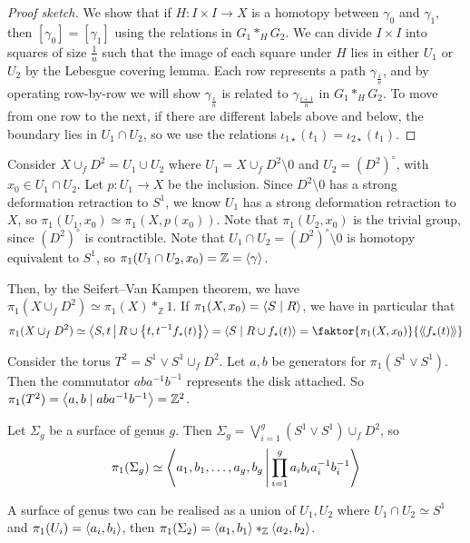\begin{proof}[Proof sketch]
	We show that if \( H \colon I \times I \to X \) is a homotopy between \( \gamma_0 \) and \( \gamma_1 \), then \( [\gamma_0] = [\gamma_1] \) using the relations in \( G_1 \ast_H G_2 \).
	We can divide \( I \times I \) into squares of size \( \frac{1}{n} \) such that the image of each square under \( H \) lies in either \( U_1 \) or \( U_2 \) by the Lebesgue covering lemma.
	Each row represents a path \( \gamma_{\frac{i}{n}} \), and by operating row-by-row we will show \( \gamma_{\frac{i}{n}} \) is related to \( \gamma_{\frac{i+1}{n}} \) in \( G_1 \ast_H G_2 \).
	To move from one row to the next, if there are different labels above and below, the boundary lies in \( U_1 \cap U_2 \), so we use the relations \( \iota_{1\star}(t_1) = \iota_{2\star}(t_1) \).
\end{proof}
\begin{example}
	Consider \( X \cup_f D^2 = U_1 \cup U_2 \) where \( U_1 = X \cup_f D^2 \setminus \qty{0} \) and \( U_2 = (D^2)^\circ \), with \( x_0 \in U_1 \cap U_2 \).
	Let \( p \colon U_1 \to X \) be the inclusion.
	Since \( D^2 \setminus \qty{0} \) has a strong deformation retraction to \( S^1 \), we know \( U_1 \) has a strong deformation retraction to \( X \), so \( \pi_1(U_1,x_0) \simeq \pi_1(X,p(x_0)) \).
	Note that \( \pi_1(U_2,x_0) \) is the trivial group, since \( (D^2)^\circ \) is contractible.
	Note that \( U_1 \cap U_2 = (D^2)^\circ \setminus \qty{0} \) is homotopy equivalent to \( S^1 \), so \( \pi_1(U_1 \cap U_2,x_0) = \mathbb Z = \left\langle{} \gamma \right\rangle \).

	Then, by the Seifert--Van Kampen theorem, we have \( \pi_1(X \cup_f D^2) \simeq \pi_1(X) \ast_{\mathbb Z} 1 \).
	If \( \pi_1(X,x_0) = \left\langle{} S \mid R \right\rangle \), we have in particular that
	\[ \pi_1(X \cup_f D^2) \simeq \genset{S, t \midd R \cup \qty{t, t^{-1}f_\star(t)}} = \genset{S \mid R \cup{f_\star(t)}} = \faktor{\pi_1(X,x_0)}{\ngenset{f_\star(t)}} \]
\end{example}
\begin{example}
	Consider the torus \( T^2 = S^1 \vee S^1 \cup_f D^2 \).
	Let \( a, b \) be generators for \( \pi_1(S^1 \vee S^1) \).
	Then the commutator \( aba^{-1}b^{-1} \) represents the disk attached.
	So \( \pi_1(T^2) = \left\langle{} a, b \mid aba^{-1}b^{-1} \right\rangle = \mathbb Z^2 \).
\end{example}
\begin{example}
	Let \( \Sigma_g \) be a surface of genus \( g \).
	Then \( \Sigma_g = \bigvee_{i=1}^g (S^1 \vee S^1) \cup_f D^2 \), so
	\[ \pi_1(\Sigma_g) \simeq \left\langle{} a_1,b_1,\dots, a_g, b_g \,\middle|\, \prod_{i=1}^g a_i b_i a_i^{-1} b_i^{-1} \right\rangle \]
\end{example}
\begin{example}
	A surface of genus two can be realised as a union of \( U_1, U_2 \) where \( U_1 \cap U_2 \simeq S^1 \) and \( \pi_1(U_i) = \left\langle{} a_i,b_i \right\rangle \), then \( \pi_1(\Sigma_2) = \left\langle{} a_1,b_1 \right\rangle \ast_{\mathbb Z} \left\langle{} a_2,b_2 \right\rangle \).
\end{example}
